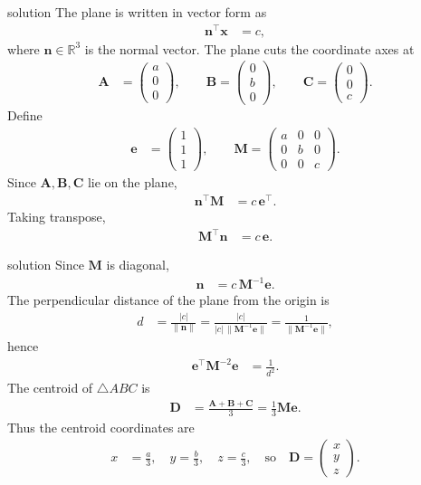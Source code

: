 \documentclass{beamer}
\numberwithin{equation}{section}
\theoremstyle{remark}
\newcommand{\myvec}[1]{\ensuremath{\begin{pmatrix}#1\end{pmatrix}}}
\let\vec\mathbf
\begin{document}
\begin{frame}{solution}
The plane is written in vector form as
\begin{align}
\vec{n}^\top \vec{x} &= c,
\end{align}
where $\vec{n}\in\mathbb{R}^3$ is the normal vector.
The plane cuts the coordinate axes at
\begin{align}
\vec{A} &= \myvec{a\\0\\0}, \qquad
\vec{B} = \myvec{0\\b\\0}, \qquad
\vec{C} = \myvec{0\\0\\c}.
\end{align}
Define
\begin{align}
\vec{e} &= \myvec{1\\1\\1}, \qquad 
\vec{M} = \myvec{a&0&0\\[4pt]0&b&0\\[4pt]0&0&c}.
\end{align}
Since $\vec{A},\vec{B},\vec{C}$ lie on the plane,
\begin{align}
\vec{n}^\top \vec{M} &= c\, \vec{e}^\top.
\end{align}
Taking transpose,
\begin{align}
\vec{M}^\top \vec{n} &= c\, \vec{e}.
\end{align}
\end{frame}
\begin{frame}{solution}
Since $\vec{M}$ is diagonal,
\begin{align}
\vec{n} &= c\, \vec{M}^{-1} \vec{e}.
\end{align}
The perpendicular distance of the plane from the origin is
\begin{align}
d &= \frac{|c|}{\|\vec{n}\|}
= \frac{|c|}{|c|\,\|\vec{M}^{-1}\vec{e}\|}
= \frac{1}{\|\vec{M}^{-1}\vec{e}\|},
\end{align}
hence
\begin{align}
\vec{e}^\top \vec{M}^{-2} \vec{e} &= \frac{1}{d^2}.
\end{align}
The centroid of $\triangle ABC$ is
\begin{align}
\vec{D} &= \frac{\vec{A}+\vec{B}+\vec{C}}{3}
= \tfrac{1}{3}\vec{M}\vec{e}.
\end{align}
Thus the centroid coordinates are
\begin{align}
x &= \tfrac{a}{3}, \quad y = \tfrac{b}{3}, \quad z = \tfrac{c}{3},
\quad\text{so}\quad
\vec{D} = \myvec{x\\y\\z}.
\end{align}
\end{frame}
\end{document}
